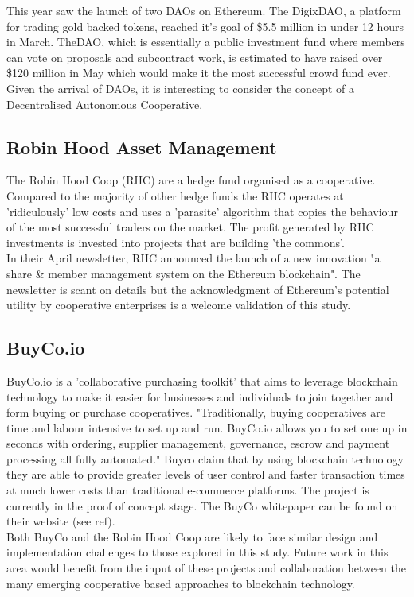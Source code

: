 This year saw the launch of two DAOs on Ethereum. The DigixDAO\cite{Digix}, a platform for trading gold backed tokens, reached it's goal of \$5.5 million in under 12 hours in March\cite{DigixCrowd}. TheDAO\cite{TheDAO}, which is essentially a public investment fund where members can vote on proposals and subcontract work, is estimated to have raised over \$120 million in May which would make it the most successful crowd fund ever\cite{DAOCrowd}.\\

Given the arrival of DAOs, it is interesting to consider the concept of a Decentralised Autonomous Cooperative.\\

\subsection{Robin Hood Asset Management}
\label{subsec:RobinHood}
The Robin Hood Coop (RHC)\cite{RHC} are a hedge fund organised as a cooperative. Compared to the majority of other hedge funds the RHC operates at 'ridiculously' low costs and uses a 'parasite' algorithm that copies the behaviour of the most successful traders on the market. The profit generated by RHC investments is invested into projects that are building 'the commons'. \\

In their April newsletter, RHC announced the launch of a new innovation "a share \& member management system on the Ethereum blockchain". The newsletter is scant on details but the acknowledgment of Ethereum's potential utility by cooperative enterprises is a welcome validation of this study. 

\subsection{BuyCo.io}
\label{subsec:buyco}
BuyCo.io is a 'collaborative purchasing toolkit' that aims to leverage blockchain technology to make it easier for businesses and individuals to join together and form buying or purchase cooperatives. "Traditionally, buying cooperatives are time and labour intensive to set up and run. BuyCo.io allows you to set one up in seconds with ordering, supplier management, governance, escrow and payment processing all fully automated."\cite{BuyCo} Buyco claim that by using blockchain technology they are able to provide greater levels of user control and faster transaction times at much lower costs than traditional e-commerce platforms. The project is currently in the proof of concept stage. The BuyCo whitepaper can be found on their website (see ref). \\

Both BuyCo and the Robin Hood Coop are likely to face similar design and implementation challenges to those explored in this study. Future work in this area would benefit from the input of these projects and collaboration between the many emerging cooperative based approaches to blockchain technology.



